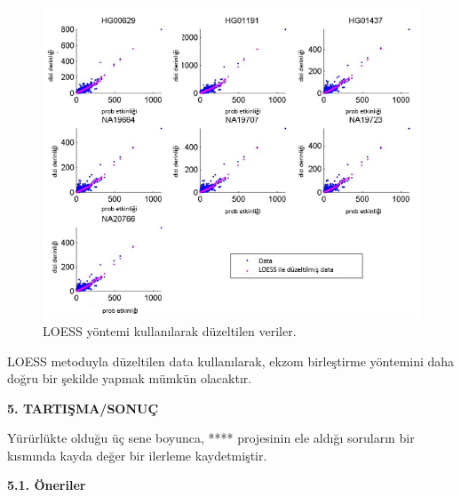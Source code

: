 \documentclass[11pt]{article}
\begin{document}
\begin{figure}[htb]
\begin{center}
  \includegraphics[scale=0.65]{captureeff-loess.png}
\end{center}
\caption{LOESS yöntemi kullanılarak düzeltilen veriler.}
\label{fig:captureeffloess}
\end{figure}

LOESS metoduyla düzeltilen data kullanılarak, ekzom birleştirme yöntemini daha doğru bir şekilde yapmak mümkün olacaktır.

\begin{center}
{\bf \Large 5. TARTIŞMA/SONUÇ}
\end{center}

\noindent
Yürürlükte olduğu üç sene boyunca, **** projesinin ele aldığı soruların bir kısmında kayda değer bir ilerleme kaydetmiştir. 

\noindent
{\bf \Large 5.1. Öneriler}

{\small 



}




\label{endsectionb1}
\end{document}
